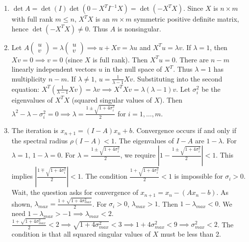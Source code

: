 \begin{solution}
\begin{enumerate}
    \item[(i)] $\det A = \det(I) \det(0 - X^T I^{-1} X) = \det(-X^T X)$. Since $X$ is $n \times m$ with full rank $m \leq n$, $X^T X$ is an $m \times m$ symmetric positive definite matrix, hence $\det(-X^T X) \neq 0$. Thus $A$ is nonsingular.

    \item[(ii)] Let $A \begin{pmatrix} u \\ v \end{pmatrix} = \lambda \begin{pmatrix} u \\ v \end{pmatrix} \implies u + Xv = \lambda u$ and $X^T u = \lambda v$.
    If $\lambda = 1$, then $Xv = 0 \implies v = 0$ (since $X$ is full rank). Then $X^T u = 0$. There are $n-m$ linearly independent vectors $u$ in the null space of $X^T$. Thus $\lambda = 1$ has multiplicity $n-m$.
    If $\lambda \neq 1$, $u = \frac{1}{\lambda - 1} Xv$. Substituting into the second equation: $X^T \left(\frac{1}{\lambda-1} Xv\right) = \lambda v \implies X^T X v = \lambda(\lambda - 1) v$.
    Let $\sigma_i^2$ be the eigenvalues of $X^T X$ (squared singular values of $X$).
    Then $\lambda^2 - \lambda - \sigma_i^2 = 0 \implies \lambda = \frac{1 \pm \sqrt{1 + 4\sigma_i^2}}{2}$ for $i=1, \dots, m$.

    \item[(iii)] The iteration is $x_{n+1} = (I - A)x_n + b$. Convergence occurs if and only if the spectral radius $\rho(I - A) < 1$.
    The eigenvalues of $I - A$ are $1 - \lambda$.
    For $\lambda = 1$, $1 - \lambda = 0$.
    For $\lambda = \frac{1 \pm \sqrt{1 + 4\sigma_i^2}}{2}$, we require $|1 - \frac{1 \pm \sqrt{1 + 4\sigma_i^2}}{2}| < 1$.
    This implies $|\frac{1 \mp \sqrt{1+4\sigma_i^2}}{2}| < 1$.
    The condition $\frac{1 + \sqrt{1+4\sigma_i^2}}{2} < 1$ is impossible for $\sigma_i > 0$.
    Wait, the question asks for convergence of $x_{n+1} = x_n - (Ax_n - b)$.
    As shown, $\lambda_{max} = \frac{1 + \sqrt{1+4\sigma_{max}^2}}{2}$. For $\sigma_i > 0$, $\lambda_{max} > 1$.
    Then $1 - \lambda_{max} < 0$. We need $1 - \lambda_{max} > -1 \implies \lambda_{max} < 2$.
    $\frac{1 + \sqrt{1+4\sigma_{max}^2}}{2} < 2 \implies \sqrt{1+4\sigma_{max}^2} < 3 \implies 1+4\sigma_{max}^2 < 9 \implies \sigma_{max}^2 < 2$.
    The condition is that all squared singular values of $X$ must be less than 2.
\end{enumerate}
\end{solution}

